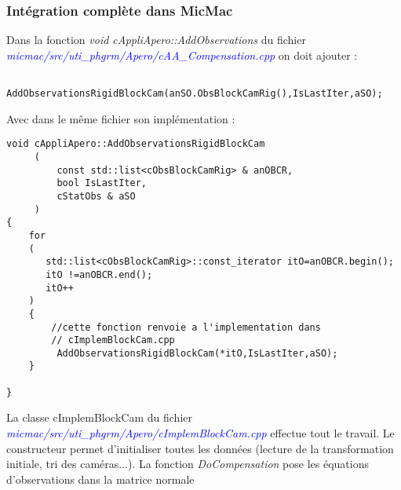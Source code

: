 \documentclass{article}
\newcommand\file[1]{
\textit{\textcolor{blue}{#1}}
}
\begin{document}
\subsubsection{Intégration complète dans MicMac}

Dans la fonction \emph{void cAppliApero::AddObservations} du fichier \file{micmac/src/uti\_phgrm/Apero/cAA\_Compensation.cpp} on doit ajouter :
\begin{verbatim}
          AddObservationsRigidBlockCam(anSO.ObsBlockCamRig(),IsLastIter,aSO);
\end{verbatim}

Avec dans le même fichier son implémentation :
\begin{verbatim}
void cAppliApero::AddObservationsRigidBlockCam
     (
         const std::list<cObsBlockCamRig> & anOBCR,
         bool IsLastIter,
         cStatObs & aSO
     )
{
    for 
    (
       std::list<cObsBlockCamRig>::const_iterator itO=anOBCR.begin();
       itO !=anOBCR.end();
       itO++
    )
    {
		//cette fonction renvoie a l'implementation dans 
		// cImplemBlockCam.cpp
         AddObservationsRigidBlockCam(*itO,IsLastIter,aSO);
    }

}
\end{verbatim}

La classe cImplemBlockCam du fichier \file{micmac/src/uti\_phgrm/Apero/cImplemBlockCam.cpp} effectue tout le travail.
Le constructeur permet d'initialiser toutes les données (lecture de la transformation initiale, tri des caméras...).
La fonction \emph{DoCompensation} pose les équations d'observations dans la matrice normale
\end{document}
